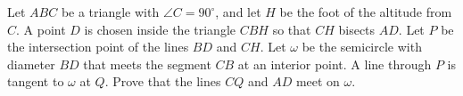 Let $ABC$ be a triangle with $\angle C = 90^\circ$, and let $H$ be the foot of the altitude from $C$. A point $D$ is chosen inside the triangle $CBH$ so that $CH$ bisects $AD$. Let $P$ be the intersection point of the lines $BD$ and $CH$. Let $\omega$ be the semicircle with diameter $BD$ that meets the segment $CB$ at an interior point. A line through $P$ is tangent to $\omega$ at $Q$. Prove that the lines $CQ$ and $AD$ meet on $\omega$.
